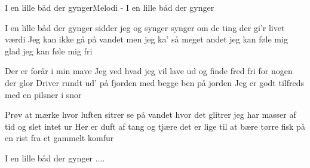 \begin{sang}{I en lille båd der gynger}{Melodi - I en lille båd der gynger}
\begin{vers}
I en lille båd der gynger
sidder jeg og synger
synger om de ting
der gi'r livet værdi
Jeg kan ikke gå på vandet
men jeg ka' så meget andet
jeg kan føle mig glad
jeg kan føle mig fri
\end{vers}
\begin{vers}
Der er forår i min mave
Jeg ved hvad jeg vil lave
ud og finde fred
fri for nogen der glor
Driver rundt ud' på fjorden
med begge ben på jorden
Jeg er godt tilfreds
med en pilsner i snor
\end{vers}
\vfill
\begin{vers}
Prøv at mærke hvor luften sitrer
se på vandet hvor det glitrer
jeg har masser af tid
og slet intet ur
Her er duft af tang og tjære
det er lige til at bære
tørre fisk på en rist fra et gammelt komfur
\end{vers}
\begin{vers}
I en lille båd der gynger ....
\end{vers}
\laps
\end{sang}